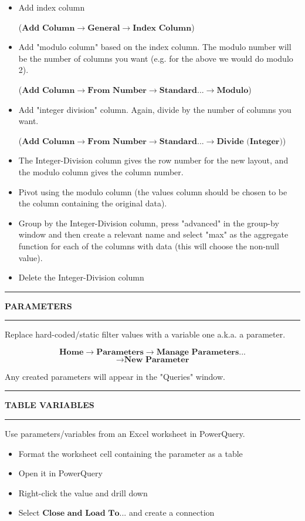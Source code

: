 \documentclass[8pt]{extarticle}
\newcommand{\heading}[1]{%
    \noindent
    \rule{\linewidth}{0.4pt}
    \begin{center}
        \vspace{-1ex}
        \textbf{#1}        
        \vspace{-2.5ex}
    \end{center}
    \rule{\linewidth}{0.4pt}
}
\begin{document}
\begin{multicols}{3}
\begin{itemize}
    \item Add index column 
    
    ($\textbf{Add Column} \rightarrow \textbf{General} \rightarrow \textbf{Index Column}$)
    \item Add "modulo column" based on the index column. The modulo number will be the number of columns you want (e.g. for the above we would do modulo 2).
    
    ($\textbf{Add Column} \rightarrow \textbf{From Number} \rightarrow \textbf{Standard...} \rightarrow \textbf{Modulo}$)
    \item Add "integer division" column. Again, divide by the number of columns you want.
    
    ($\textbf{Add Column} \rightarrow \textbf{From Number} \rightarrow \textbf{Standard...} \rightarrow \textbf{Divide (Integer)}$)
    \item The Integer-Division column gives the row number for the new layout, and the modulo column gives the column number.
    \item Pivot using the modulo column (the values column should be chosen to be the column containing the original data).
    \item Group by the Integer-Division column, press "advanced" in the group-by window and then create a relevant name and select "max" as the aggregate function for each of the columns with data (this will choose the non-null value).
    \item Delete the Integer-Division column
\end{itemize}

\heading{PARAMETERS}

Replace hard-coded/static filter values with a variable one a.k.a. a parameter.

\[\textbf{Home} \rightarrow \textbf{Parameters} \rightarrow \textbf{Manage Parameters...} \]\[\rightarrow \textbf{New Parameter} \]

Any created parameters will appear in the "Queries" window.

\heading{TABLE VARIABLES}

Use parameters/variables from an Excel worksheet in PowerQuery. 

\begin{itemize}
    \item Format the worksheet cell containing the parameter as a table
    \item Open it in PowerQuery
    \item Right-click the value and drill down
    \item Select $\textbf{Close and Load To...}$ and create a connection
\end{itemize}


\end{multicols}
\end{document}
